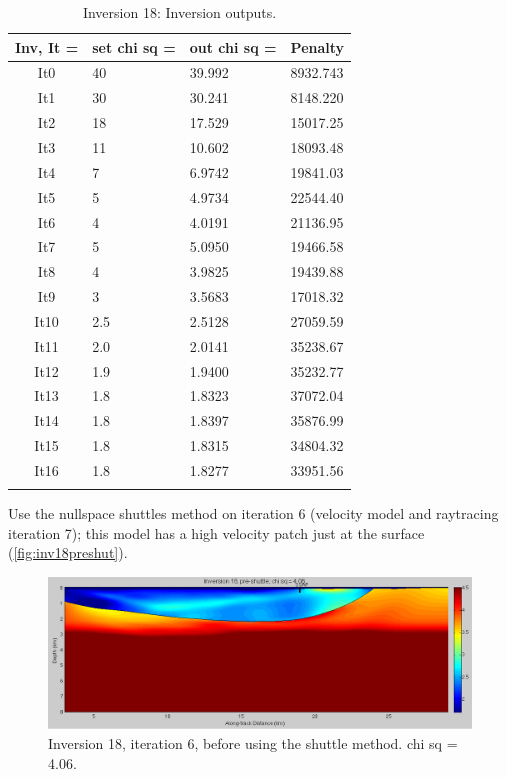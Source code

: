 \documentclass[fontsize=11pt, %
                             paper=a4, %
                             twoside, %
                             captions=tableheading,
                             index=totoc,
                             hyperref]{labbook}
\begin{document}
\begin{addmargin}[4cm]{0cm}
\begin{table}[!ht]
\label{tab:i18}
\raggedleft
\begin{tabular}{c l l l}
\toprule
\textbf{Inv, It = } & \textbf{set chi sq =} & \textbf{out chi sq =} & \textbf{Penalty} \\
\toprule
It0 & 40 & 39.992 & 8932.743\\
It1 & 30 & 30.241 & 8148.220\\
It2 & 18 & 17.529 & 15017.25\\
It3 & 11 & 10.602 & 18093.48\\
It4 & 7 & 6.9742 & 19841.03\\
It5 & 5 & 4.9734 & 22544.40\\
It6 & 4 & 4.0191 & 21136.95\\
It7 & 5 & 5.0950 & 19466.58\\
It8 & 4 & 3.9825 & 19439.88\\
It9 & 3 & 3.5683 & 17018.32\\
It10 & 2.5 & 2.5128 & 27059.59\\
It11 & 2.0 & 2.0141 & 35238.67\\
It12 & 1.9 & 1.9400 & 35232.77\\
It13 & 1.8 & 1.8323 & 37072.04\\
It14 & 1.8 & 1.8397 & 35876.99\\
It15 & 1.8 & 1.8315 & 34804.32\\
It16 & 1.8 & 1.8277 & 33951.56\\
\bottomrule\\
\end{tabular}
\caption{Inversion 18: Inversion outputs.}
\end{table}

\clearpage{}

Use the nullspace shuttles method on iteration 6 (velocity model and raytracing iteration 7); this model has a high velocity patch just at the surface (\autoref{fig:inv18preshut}).  

\begin{figure}[h!]
\raggedleft
\includegraphics[scale=0.4,keepaspectratio=true]{figs/inv18_preshut.png}
\caption{Inversion 18, iteration 6, before using the shuttle method.  chi sq = 4.06.}
\label{fig:inv18preshut}
\end{figure}


\end{addmargin}
\end{document}
